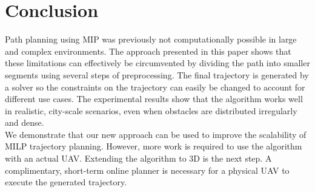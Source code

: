 \section{Conclusion}
Path planning using MIP was previously not computationally possible in large and complex environments. The approach presented in this paper shows that these limitations can effectively be circumvented by dividing the path into smaller segments using several steps of preprocessing. The final trajectory is generated by a solver so the constraints on the trajectory can easily be changed to account for different use cases. The experimental results show that the algorithm works well in realistic, city-scale scenarios, even when obstacles are distributed irregularly and dense.\\
We demonstrate that our new approach can be used to improve the scalability of MILP trajectory planning. However, more work is required to use the algorithm with an actual UAV.  Extending the algorithm to 3D is the next step. A complimentary, short-term online planner is necessary for a physical UAV to execute the generated trajectory.